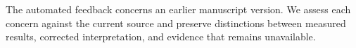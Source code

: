 The automated feedback concerns an earlier manuscript version.
We assess each concern against the current source and preserve distinctions between measured results, corrected interpretation, and evidence that remains unavailable.
